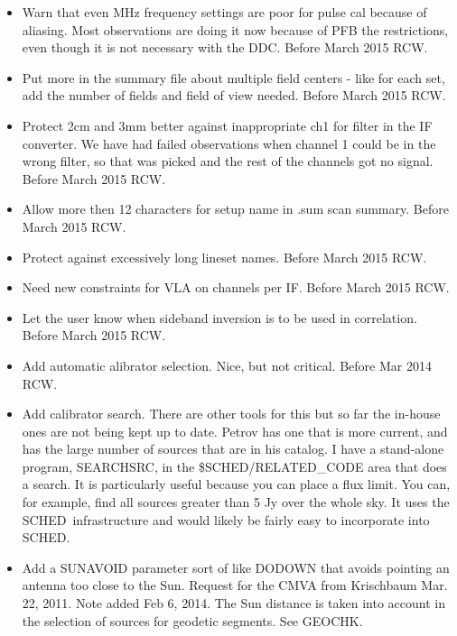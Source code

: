 \documentclass{report}
\newcommand{\sched}{{\sc SCHED}}
\newcommand{\schedb}{{\sc SCHED~}}
\begin{document}
\begin{itemize}
\item Warn that even MHz frequency settings are poor for pulse cal
      because of aliasing.  Most observations are doing it now because 
      of PFB the restrictions, even though it is not necessary with 
      the DDC.  Before March 2015  RCW.

\item Put more in the summary file about multiple field centers - like 
      for each set, add the number of fields and field of view needed.
      Before March 2015  RCW.

\item Protect 2cm and 3mm better against inappropriate ch1 for filter
      in the IF converter.  We have had failed observations when channel 1
      could be in the wrong filter, so that was picked and the rest of
      the channels got no signal.  Before March 2015  RCW.

\item Allow more then 12 characters for setup name in .sum scan summary.
      Before March 2015  RCW.

\item Protect against excessively long lineset names. Before March 2015  RCW.

\item Need new constraints for VLA on channels per IF. Before March 2015  RCW.

\item Let the user know when sideband inversion is to be used in correlation.
      Before March 2015  RCW.

\item Add automatic alibrator selection.  Nice, but not critical.  Before 
      Mar 2014  RCW.

\item Add calibrator search.  There are other tools for this but so far the
      in-house ones are not being kept up to date.  Petrov has one that is
      more current, and has the large number of sources that are in his 
      catalog.  I have a stand-alone program, SEARCHSRC, in the 
      \$SCHED/RELATED\_CODE area that does a search.  It is particularly 
      useful because you can place a flux limit.  You can, for example, 
      find all sources greater than 5 Jy over the whole sky.  
      It uses the \schedb infrastructure and would likely be fairly easy 
      to incorporate into \sched.

\item Add a SUNAVOID parameter sort of like DODOWN that avoids pointing
      an antenna too close to the Sun.  Request for the CMVA from
      Krischbaum  Mar. 22, 2011.  Note added Feb 6, 2014.  The Sun
      distance is taken into account in the selection of sources for
      geodetic segments.  See GEOCHK.


\end{itemize}
\end{document}
